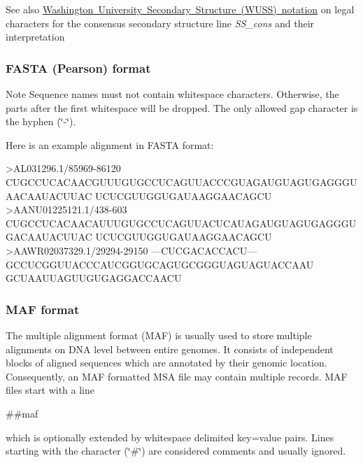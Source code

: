 \begin{DoxySeeAlso}{See also}
\mbox{\hyperlink{rna_structure_notations_wuss-notation}{Washington University Secondary Structure (W\+U\+SS) notation}} on legal characters for the consensus secondary structure line {\itshape S\+S\+\_\+cons} and their interpretation
\end{DoxySeeAlso}
\hypertarget{file_formats_msa-formats-fasta}{}\subsubsection{F\+A\+S\+T\+A (\+Pearson) format}\label{file_formats_msa-formats-fasta}
\begin{DoxyNote}{Note}
Sequence names must not contain whitespace characters. Otherwise, the parts after the first whitespace will be dropped. The only allowed gap character is the hyphen {\itshape }(\char`\"{}-\/\char`\"{}).
\end{DoxyNote}
Here is an example alignment in F\+A\+S\+TA format\+: 
\begin{DoxyVerbInclude}
>AL031296.1/85969-86120
CUGCCUCACAACGUUUGUGCCUCAGUUACCCGUAGAUGUAGUGAGGGUAACAAUACUUAC
UCUCGUUGGUGAUAAGGAACAGCU
>AANU01225121.1/438-603
CUGCCUCACAACAUUUGUGCCUCAGUUACUCAUAGAUGUAGUGAGGGUGACAAUACUUAC
UCUCGUUGGUGAUAAGGAACAGCU
>AAWR02037329.1/29294-29150
---CUCGACACCACU---GCCUCGGUUACCCAUCGGUGCAGUGCGGGUAGUAGUACCAAU
GCUAAUUAGUUGUGAGGACCAACU
\end{DoxyVerbInclude}
\hypertarget{file_formats_msa-formats-maf}{}\subsubsection{M\+A\+F format}\label{file_formats_msa-formats-maf}
The multiple alignment format (M\+AF) is usually used to store multiple alignments on D\+NA level between entire genomes. It consists of independent blocks of aligned sequences which are annotated by their genomic location. Consequently, an M\+AF formatted M\+SA file may contain multiple records. M\+AF files start with a line \begin{DoxyVerb}##maf
\end{DoxyVerb}
 which is optionally extended by whitespace delimited key=value pairs. Lines starting with the character (\char`\"{}\#\char`\"{}) are considered comments and usually ignored.

